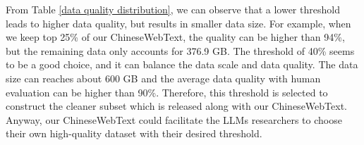 \documentclass{article}
\begin{document}
From Table \ref{data quality distribution},
we can observe that a lower threshold leads to higher data quality, but results in smaller data size. For example, when we keep top 25\% of our ChineseWebText, the quality can be higher than 94\%, but the remaining data only accounts for 376.9 GB. The threshold of 40\% seems to be a good choice, and it can balance the data scale and data quality. The data size can reaches about 600 GB and the average data quality with human evaluation can be higher than 90\%. Therefore, this threshold is selected to construct the cleaner subset which is released along with our ChineseWebText. Anyway, our ChineseWebText could facilitate the LLMs researchers to choose their own high-quality dataset with their desired threshold.






\end{document}
